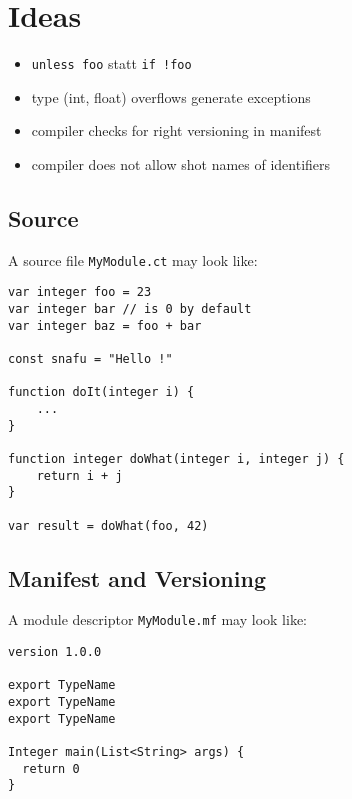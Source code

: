 \documentclass[a4paper,12pt]{article}
\begin{document}
\section{Ideas}

\begin{itemize}
	\item \texttt{unless foo} statt \texttt{if !foo}
	\item type (int, float) overflows generate exceptions
	\item compiler checks for right versioning in manifest
	\item compiler does not allow shot names of identifiers
\end{itemize}

\subsection{Source}

A source file \texttt{MyModule.ct} may look like:

\begin{verbatim}
var integer foo = 23
var integer bar // is 0 by default
var integer baz = foo + bar

const snafu = "Hello !"

function doIt(integer i) {
    ...
}

function integer doWhat(integer i, integer j) {
    return i + j
}

var result = doWhat(foo, 42)	
\end{verbatim}

\subsection{Manifest and Versioning}

A module descriptor \texttt{MyModule.mf} may look like:

\begin{verbatim}
version 1.0.0

export TypeName
export TypeName
export TypeName

Integer main(List<String> args) {
  return 0
}
\end{verbatim}
\end{document}
